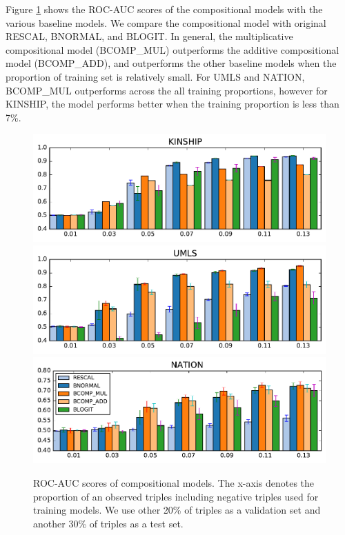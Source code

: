 Figure \ref{fig:r_vs_br} shows the ROC-AUC scores of the compositional models with the various baseline models. We compare the compositional model with original RESCAL, BNORMAL, and BLOGIT. In general, the multiplicative compositional model (BCOMP\_MUL) outperforms the additive compositional model (BCOMP\_ADD), and outperforms the other baseline models when the proportion of training set is relatively small. For UMLS and NATION, BCOMP\_MUL outperforms across the all training proportions, however for KINSHIP, the model performs better when the training proportion is less than 7\%.

\begin{figure}[t]
	\centering
	\includegraphics[width=\linewidth]{images/comp_training_error_kinship_small.pdf}
	\includegraphics[width=\linewidth]{images/comp_training_error_umls_small.pdf}			
	\includegraphics[width=\linewidth]{images/comp_training_error_nation_small.pdf}				
	\caption{\label{fig:r_vs_br} ROC-AUC scores of compositional models. 
	The x-axis denotes the proportion of an observed triples including negative triples used for training 
	models. We use other 20\% of triples as a validation set and another 30\% of triples as a test set. 
}
\end{figure} 

